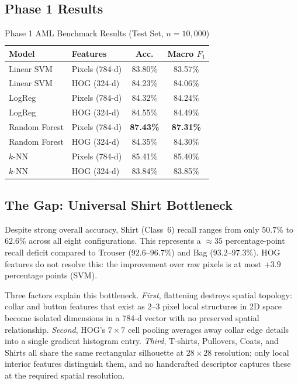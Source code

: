 \documentclass[conference]{IEEEtran}
\begin{document}
\subsection{Phase 1 Results}

\begin{table}[h]
\centering
\caption{Phase 1 AML Benchmark Results (Test Set, $n=10{,}000$)}
\label{tab:phase1}
\small
\begin{tabular}{llcc}
\toprule
\textbf{Model} & \textbf{Features} & \textbf{Acc.} & \textbf{Macro $F_1$} \\
\midrule
Linear SVM    & Pixels (784-d) & 83.80\% & 83.57\% \\
Linear SVM    & HOG (324-d)    & 84.23\% & 84.06\% \\
LogReg        & Pixels (784-d) & 84.32\% & 84.24\% \\
LogReg        & HOG (324-d)    & 84.55\% & 84.49\% \\
Random Forest & Pixels (784-d) & \textbf{87.43\%} & \textbf{87.31\%} \\
Random Forest & HOG (324-d)    & 84.35\% & 84.30\% \\
$k$-NN        & Pixels (784-d) & 85.41\% & 85.40\% \\
$k$-NN        & HOG (324-d)    & 83.84\% & 83.85\% \\
\bottomrule
\end{tabular}
\end{table}

\subsection{The Gap: Universal Shirt Bottleneck}

Despite strong overall accuracy, Shirt (Class~6) recall ranges from only
$50.7\%$ to $62.6\%$ across all eight configurations. This represents a
${\approx}35$ percentage-point recall deficit compared to Trouser ($92.6$--$96.7\%$)
and Bag ($93.2$--$97.3\%$). HOG features do not resolve this: the
improvement over raw pixels is at most $+3.9$ percentage points (SVM).

Three factors explain this bottleneck. \emph{First}, flattening destroys
spatial topology: collar and button features that exist as $2$--$3$ pixel
local structures in 2D space become isolated dimensions in a 784-d vector
with no preserved spatial relationship. \emph{Second}, HOG's $7\times7$
cell pooling averages away collar edge details into a single gradient
histogram entry. \emph{Third}, T-shirts, Pullovers, Coats, and Shirts all
share the same rectangular silhouette at $28\times28$ resolution; only
local interior features distinguish them, and no handcrafted descriptor
captures these at the required spatial resolution.
\end{document}
